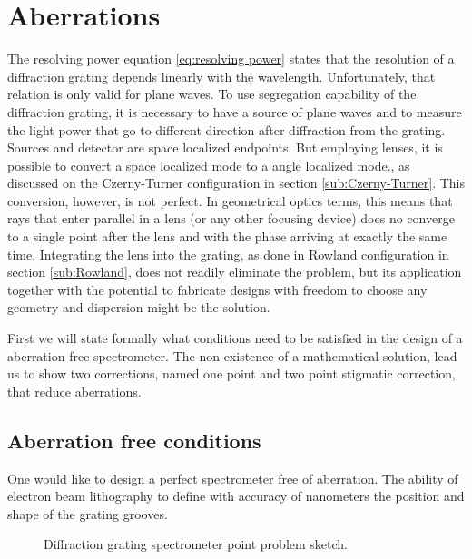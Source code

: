 \documentclass[12pt,twoside,english]{book}
\renewcommand{\~}{\perispomeni}%
\numberwithin{equation}{section}
\numberwithin{figure}{section}
\begin{document}
\section{Aberrations}
The resolving power equation \ref{eq:resolving power} states that the resolution of a diffraction grating depends linearly with the wavelength. Unfortunately, that relation is only valid for plane waves. To use segregation capability of the diffraction grating, it is necessary to have a source of plane waves and to measure the light power that go to different direction after diffraction from the grating. Sources and detector are space localized endpoints. But employing lenses, it is possible to convert a space localized mode to a angle localized mode., as discussed on the Czerny-Turner configuration in section \ref{sub:Czerny-Turner}. This conversion, however, is not perfect. In geometrical optics terms, this means that rays that enter parallel in a lens (or any other focusing device) does no converge to a single point after the lens and with the phase arriving at exactly the same time. Integrating the lens into the grating, as done in Rowland configuration in section \ref{sub:Rowland}, does not readily eliminate the problem, but its application together with the potential to fabricate designs with freedom to choose any geometry and dispersion might be the solution.

First we will state formally what conditions need to be satisfied in the design of a aberration free spectrometer. The non-existence of a mathematical solution, lead us to show two corrections, named one point and two point stigmatic correction, that reduce aberrations. 

\subsection{Aberration free conditions}
One would like to design a perfect spectrometer free of aberration. The ability of electron beam lithography to define with accuracy of nanometers the position and shape of the grating grooves.

%
\begin{figure}
\centering
\caption{Diffraction grating spectrometer point problem sketch.}
\label{fig:aberration free}
\end{figure}
\end{document}
